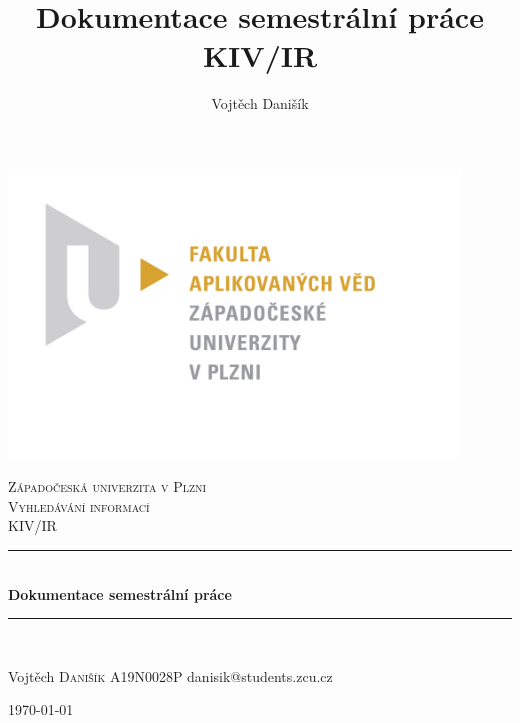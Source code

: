 \documentclass[12pt, a4paper]{article}
\title{\textbf{Dokumentace semestrální práce} \\KIV/IR}
\author{Vojtěch Danišík}
\begin{document}
\begin{titlepage} 
	\newcommand{\HRule}{\rule{\linewidth}{0.5mm}} 
	\begin{center}
	\includegraphics[width=12cm]{img/fav_logo}\\
	\end{center}
	\textsc{\LARGE Západočeská univerzita v Plzni}\\[1.5cm] 	
	\textsc{\Large Vyhledávání informací}\\[0.5cm] 
	\textsc{\large KIV/IR}\\[0.5cm] 
	\HRule\\[0.4cm]
	{\huge\bfseries Dokumentace semestrální práce}\\[0.4cm] 
	\HRule\\[1.5cm]

	\begin{minipage}{0.4\textwidth}
		\begin{flushleft}
			\large
			Vojtěch \textsc{Danišík}\newline
			A19N0028P\newline
			danisik@students.zcu.cz
		\end{flushleft}
	\end{minipage}
	\vfill\vfill\vfill
	\begin{flushright}
	{\large\today}
	\end{flushright}
	\vfill 
\end{titlepage}
\newpage
\tableofcontents
\newpage
\end{document}
